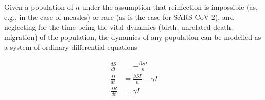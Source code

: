 \documentclass{article}
\begin{document}
Given a population of $n$ under the assumption that reinfection is impossible (as, e.g., in the case of measles) or rare (as is the case for SARS-CoV-2\cite{edridge2020human,deng2020primary,bao2020reinfection}), and neglecting for the time being the vital dynamics (birth, unrelated death, migration) of the population, the dynamics of any population can be modelled as a system of ordinary differential equations

\begin{equation}
	\begin{aligned}
		\frac{dS}{dt} &= - \frac{\beta S I}{n} 								\\
		\frac{dI}{dt} &= \frac{\beta S I}{n} - \gamma I 					\\
		\frac{dR}{dt} &= \gamma I
	\end{aligned}
	\label{eq:sir_equation}
\end{equation}
\end{document}
